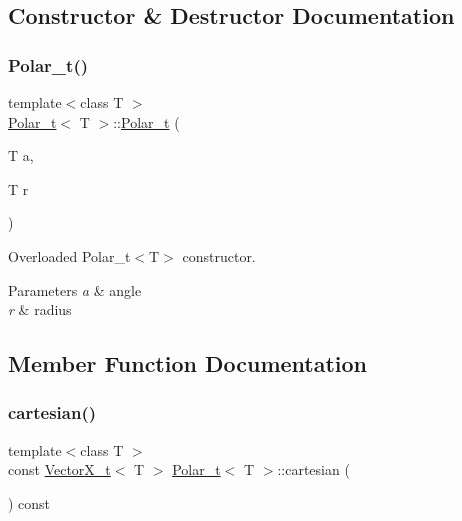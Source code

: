 \subsection{Constructor \& Destructor Documentation}
\mbox{\label{class_polar__t_a862fc0e18df7dad1470152e6ef2bd340}} 
\subsubsection{\texorpdfstring{Polar\+\_\+t()}{Polar\_t()}}
{\footnotesize\ttfamily template$<$class T $>$ \\
\hyperlink{class_polar__t}{Polar\+\_\+t}$<$ T $>$\+::\hyperlink{class_polar__t}{Polar\+\_\+t} (\begin{DoxyParamCaption}\item[{T}]{a,  }\item[{T}]{r }\end{DoxyParamCaption})}



Overloaded Polar\+\_\+t$<$\+T$>$ constructor. 


\begin{DoxyParams}{Parameters}
{\em a} & angle \\
\hline
{\em r} & radius \\
\hline
\end{DoxyParams}


\subsection{Member Function Documentation}
\mbox{\label{class_polar__t_aa4f91bf6479b2d2cefb22d79de8e1d42}} 
\subsubsection{\texorpdfstring{cartesian()}{cartesian()}}
{\footnotesize\ttfamily template$<$class T $>$ \\
const \hyperlink{class_vector_x__t}{Vector\+X\+\_\+t}$<$ T $>$ \hyperlink{class_polar__t}{Polar\+\_\+t}$<$ T $>$\+::cartesian (\begin{DoxyParamCaption}{ }\end{DoxyParamCaption}) const}



